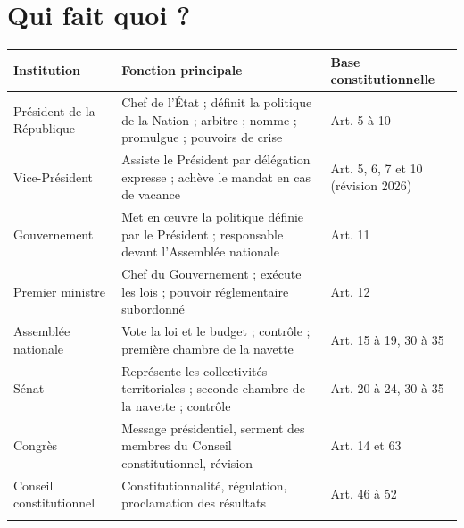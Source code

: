 \documentclass[11pt,a4paper,oneside]{report}
\begin{document}
\section{Qui fait quoi ?}
\begin{longtable}{>{\raggedright\arraybackslash}p{} >{\raggedright\arraybackslash}p{} >{\raggedright\arraybackslash}p{}}
\toprule
\textbf{\color{navy}Institution} & \textbf{\color{navy}Fonction principale} & \textbf{\color{navy}Base constitutionnelle} \\
\midrule\endhead
Président de la République & Chef de l'État ; définit la politique de la Nation ; arbitre ; nomme ; promulgue ; pouvoirs de crise & Art. 5 à 10 \\
\addlinespace[1pt]
Vice-Président & Assiste le Président par délégation expresse ; achève le mandat en cas de vacance & Art. 5, 6, 7 et 10 (révision 2026) \\
\addlinespace[1pt]
Gouvernement & Met en œuvre la politique définie par le Président ; responsable devant l'Assemblée nationale & Art. 11 \\
\addlinespace[1pt]
Premier ministre & Chef du Gouvernement ; exécute les lois ; pouvoir réglementaire subordonné & Art. 12 \\
\addlinespace[1pt]
Assemblée nationale & Vote la loi et le budget ; contrôle ; première chambre de la navette & Art. 15 à 19, 30 à 35 \\
\addlinespace[1pt]
Sénat & Représente les collectivités territoriales ; seconde chambre de la navette ; contrôle & Art. 20 à 24, 30 à 35 \\
\addlinespace[1pt]
Congrès & Message présidentiel, serment des membres du Conseil constitutionnel, révision & Art. 14 et 63 \\
\addlinespace[1pt]
Conseil constitutionnel & Constitutionnalité, régulation, proclamation des résultats & Art. 46 à 52 \\
\addlinespace[1pt]
\bottomrule
\end{longtable}
\end{document}
